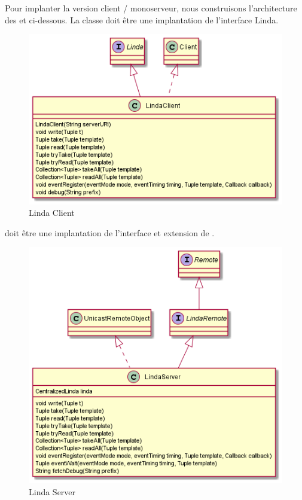 Pour implanter la version client / monoserveur, nous construisons l'architecture des 
et  ci-dessous. La classe  doit être une implantation de
l'interface Linda.

\begin{figure}[H]
    \centering
    \includegraphics[scale=0.7]{src/part-03/src/fig-4.png}
    \caption{Linda Client} \label{fig:linda-client}
\end{figure}

 doit être une implantation de l'interface  et extension de
.

\begin{figure}[H]
    \centering
    \includegraphics[scale=0.7]{src/part-03/src/fig-5.png}
    \caption{Linda Server} \label{fig:linda-server}
\end{figure}
